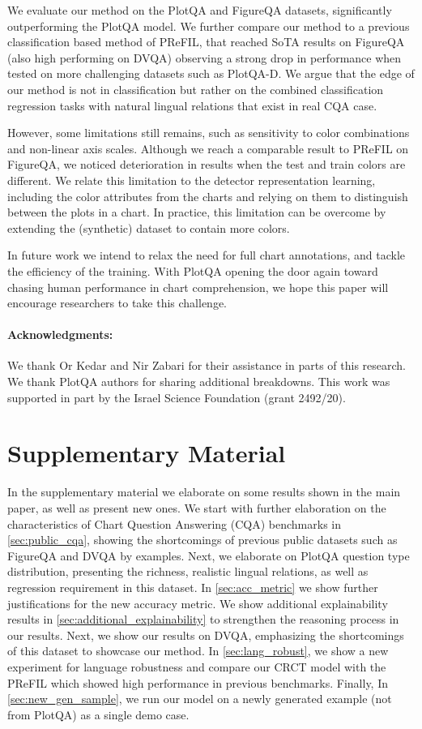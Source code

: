 \documentclass[runningheads]{llncs}
\begin{document}
We evaluate our method on the PlotQA and FigureQA datasets, significantly outperforming the PlotQA model.
We further compare our method to a previous classification based method of PReFIL, that reached SoTA results on FigureQA (also high performing on DVQA) observing a strong drop in performance when tested on more challenging datasets such as PlotQA-D. We argue that the edge of our method is not in classification but rather on the combined classification regression tasks with natural lingual relations that exist in real CQA case.


However, some limitations still remains, such as sensitivity to 
color combinations and non-linear axis scales. Although we reach a comparable result to PReFIL on FigureQA, we noticed deterioration in results when the test and train colors are different. We relate this limitation to the detector representation learning, including the color attributes from the charts and relying on them to distinguish between the plots in a chart. In practice, this limitation can be overcome by extending the (synthetic) dataset to contain more colors.


In future work we intend to relax the need for full chart annotations, and tackle the efficiency of the training.
With PlotQA opening the door again toward chasing human performance in chart comprehension, we hope this paper will encourage researchers to take this challenge. 
\paragraph{\bf Acknowledgments:} 
We thank Or Kedar and Nir Zabari for their assistance in parts of this research. We thank PlotQA \cite{plotqa} authors for sharing additional breakdowns.
This work was supported in part by the Israel Science Foundation (grant 2492/20).
%
 


\newpage
\appendix
\section*{\LARGE{Supplementary Material}}
In the supplementary material we elaborate on some results shown in the main paper, as well as present new ones. We start with further elaboration on the characteristics of Chart Question Answering (CQA) benchmarks in \cref{sec:public_cqa}, showing the shortcomings of previous public datasets such as FigureQA\cite{figureqa} and DVQA\cite{dvqa} by examples. Next, we elaborate on PlotQA\cite{plotqa} question type distribution, presenting the richness, realistic lingual relations, as well as regression requirement in this dataset. In \cref{sec:acc_metric} we show further justifications for the new accuracy metric. We show additional explainability results in \cref{sec:additional_explainability} to strengthen the reasoning process in our results. Next, we show our results on DVQA, emphasizing the shortcomings of this dataset to showcase our method.
In \cref{sec:lang_robust}, we show a new experiment for language robustness and compare our CRCT model with the PReFIL\cite{prefil} which showed high performance in previous benchmarks. Finally, In \cref{sec:new_gen_sample}, we run our model on a newly generated example (not from PlotQA) as a single demo case.
\end{document}
